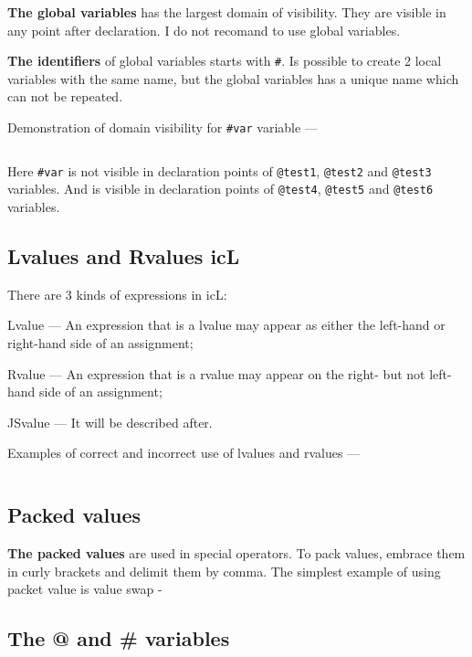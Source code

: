 \textbf{The global variables} has the largest domain of visibility. They are visible in any point after declaration. I do not recomand to use global variables.

{\bf The identifiers} of global variables starts with \texttt{#}. Is possible to create 2 local variables with the same name, but the global variables has a unique name which can not be repeated.

Demonstration of domain visibility for \texttt{#var} variable —
\inputminted[linenos]{icl}{../sources/globalvars.icL}

Here \texttt{#var} is not visible in declaration points of \texttt{@test1}, \texttt{@test2} and \texttt{@test3} variables. And is visible in declaration points of \texttt{@test4}, \texttt{@test5} and \texttt{@test6} variables.

\subsection{Lvalues and Rvalues icL}

There are 3 kinds of expressions in icL:

\begin{icEnum}
\item
	Lvalue — An expression that is a lvalue may appear as either the left-hand or right-hand side of an assignment;
\item
	Rvalue — An expression that is a rvalue may appear on the right- but not left-hand side of an assignment;
\item
	JSvalue — It will be described after.
\end{icEnum}
Examples of correct and incorrect use of lvalues and rvalues —
\inputminted[linenos]{icl}{../sources/rlvalues.icL}

\subsection{Packed values}

{\bf The packed values} are used in special operators. To pack values, embrace them in curly brackets and delimit them by comma. The simplest example of using packet value is value swap -

\subsection{The @ and \# variables}

